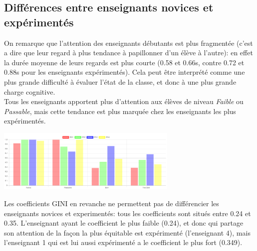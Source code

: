 \documentclass{article}
\begin{document}
\subsection{Différences entre enseignants novices et expérimentés}
On remarque que l'attention des enseignants débutants est plus fragmentée (c'est a dire que leur regard à plus tendance à papillonner d'un élève à l'autre): en effet la durée moyenne de leurs regards est plus courte (0.58 et 0.66s, contre 0.72 et 0.88s pour les enseignants expérimentés). Cela peut être interprété comme une plus grande difficulté à évaluer l'état de la classe, et donc à une plus grande charge cognitive.\\
Tous les enseignants apportent plus d'attention aux élèves de niveau \textit{Faible} ou \textit{Passable}, mais cette tendance est plus marquée chez les enseignants les plus expérimentés.\\
\begin{center}
    \includegraphics[height=3cm]{niv_francais.png}
\end{center}
Les coefficients GINI en revanche ne permettent pas de différencier les enseignants novices et experimentés: tous les coefficients sont situés entre 0.24 et 0.35. L'enseignant ayant le coefficient le plus faible (0.24), et donc qui partage son attention de la façon la plus équitable est expérimenté (l'enseignant 4), mais l'enseignant 1 qui est lui aussi expérimenté a le coefficient le plus fort (0.349).\\
\end{document}
